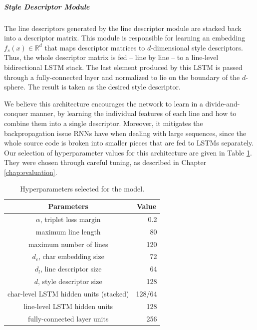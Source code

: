 \subparagraph*{Style Descriptor Module}

The line descriptors generated by the line descriptor module are stacked back into a descriptor matrix. This module is responsible for learning an embedding $f_s(x) \in \mathbb{R}^d$ that maps descriptor matrices to $d$-dimensional style descriptors. Thus, the whole descriptor matrix is fed -- line by line -- to a line-level bidirectional LSTM stack. The last element produced by this LSTM is passed through a fully-connected layer and normalized to lie on the boundary of the $d$-sphere. The result is taken as the desired style descriptor.

We believe this architecture encourages the network to learn in a divide-and-conquer manner, by learning the individual features of each line and how to combine them into a single descriptor. Moreover, it mitigates the backpropagation issue RNNs have when dealing with large sequences, since the whole source code is broken into smaller pieces that are fed to LSTMs separately. Our selection of hyperparameter values for this architecture are given in Table \ref{tab:lstm_hyper}. They were chosen through careful tuning, as described in Chapter \ref{chap:evaluation}.

\begin{table}[htbp]
	\centering
	\begin{tabular}{c|r}
		\hline
		\textbf{Parameters}           & \multicolumn{1}{c}{\textbf{Value}} \\ \hline
		$\alpha$, triplet loss margin   & 0.2                        \\ \hline
		maximum line length   & 80                        \\ \hline
		maximum number of lines   & 120                            \\ \hline
		$d_c$, char embedding size   & 72                           \\ \hline
		$d_l$, line descriptor size  & 64                            \\ \hline
		$d$, style descriptor size & 128                            \\ \hline
		char-level LSTM hidden units (stacked) & 128/64                            \\ \hline
		line-level LSTM hidden units & 128                            \\ \hline
		fully-connected layer units  & 256                            \\ \hline
	\end{tabular}
	\caption{Hyperparameters selected for the model.}
	\label{tab:lstm_hyper}
\end{table}



